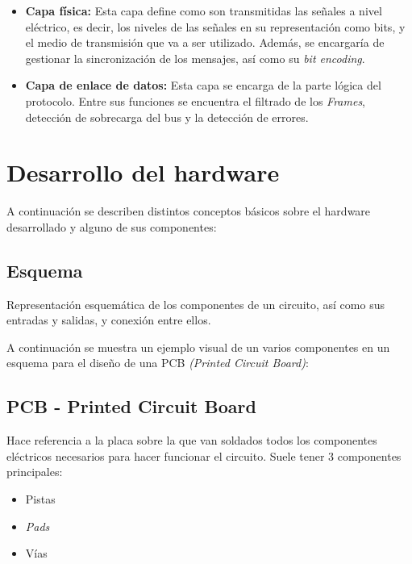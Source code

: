 \begin{itemize}

\item
\textbf{Capa física:} Esta capa define como son transmitidas las señales a nivel eléctrico, es decir, los niveles de las señales en su representación como bits, y el medio de transmisión que va a ser utilizado. Además, se encargaría de gestionar la sincronización de los mensajes, así como su \emph{bit encoding}.

\item
\textbf{Capa de enlace de datos:} Esta capa se encarga de la parte lógica del protocolo. Entre sus funciones se encuentra el filtrado de los \emph{Frames}, detección de sobrecarga del bus y la detección de errores.

\end{itemize}


\section{Desarrollo del hardware}\label{desarrollo_del_hardware}

A continuación se describen distintos conceptos básicos sobre el hardware desarrollado y alguno de sus componentes:

\subsection{Esquema}\label{esquema}

Representación esquemática de los componentes de un circuito, así como sus entradas y salidas, y conexión entre ellos.

A continuación se muestra un ejemplo visual de un varios componentes en un esquema para el diseño de una PCB \emph{(Printed Circuit Board)}:


\subsection{PCB - Printed Circuit Board}\label{pcb_printed_circuit_board}

Hace referencia a la placa sobre la que van soldados todos los componentes eléctricos necesarios para hacer funcionar el circuito. Suele tener 3 componentes principales:

\begin{itemize}
\item
Pistas
\item
\emph{Pads}
\item
Vías
\end{itemize}

